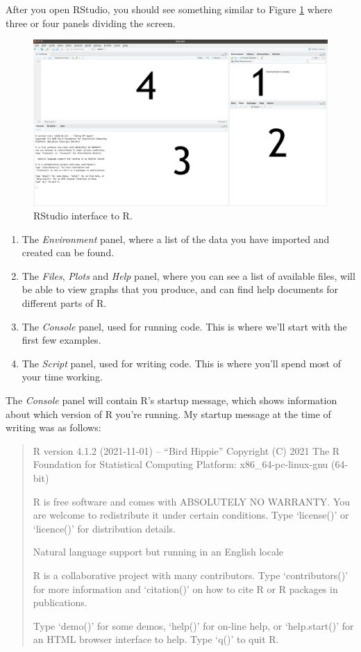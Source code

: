 \documentclass[
  12pt,
  oneside]{book}
\providecommand{\tightlist}{%
  \setlength{\itemsep}{0pt}\setlength{\parskip}{0pt}}
\theoremstyle{definition}
\theoremstyle{definition}
\theoremstyle{definition}
\theoremstyle{definition}
\theoremstyle{remark}
\begin{document}
After you open RStudio, you should see something similar to Figure \ref{fig:RStudio-interfacea} where three or four panels dividing the screen.

\begin{figure}
\includegraphics[width=0.93\linewidth]{fig/rstudio2} \caption{RStudio interface to R.}\label{fig:RStudio-interfacea}
\end{figure}

\begin{enumerate}
\def\labelenumi{\arabic{enumi}.}
\tightlist
\item
  The \emph{Environment} panel, where a list of the data you have imported and created can be found.
\item
  The \emph{Files}, \emph{Plots} and \emph{Help} panel, where you can see a list of available files, will be able to view graphs that you produce, and can find help documents for different parts of R.
\item
  The \emph{Console} panel, used for running code. This is where we'll start with the first few examples.
\item
  The \emph{Script} panel, used for writing code. This is where you'll spend most of your time working.
\end{enumerate}

The \emph{Console} panel will contain R's startup message, which shows information about which version of R you're running. My startup message at the time of writing was as follows:

\begin{quote}
R version 4.1.2 (2021-11-01) -- ``Bird Hippie''
Copyright (C) 2021 The R Foundation for Statistical Computing
Platform: x86\_64-pc-linux-gnu (64-bit)

R is free software and comes with ABSOLUTELY NO WARRANTY.
You are welcome to redistribute it under certain conditions.
Type `license()' or `licence()' for distribution details.

Natural language support but running in an English locale

R is a collaborative project with many contributors.
Type `contributors()' for more information and
`citation()' on how to cite R or R packages in publications.

Type `demo()' for some demos, `help()' for on-line help, or
`help.start()' for an HTML browser interface to help.
Type `q()' to quit R.
\end{quote}
\end{document}
